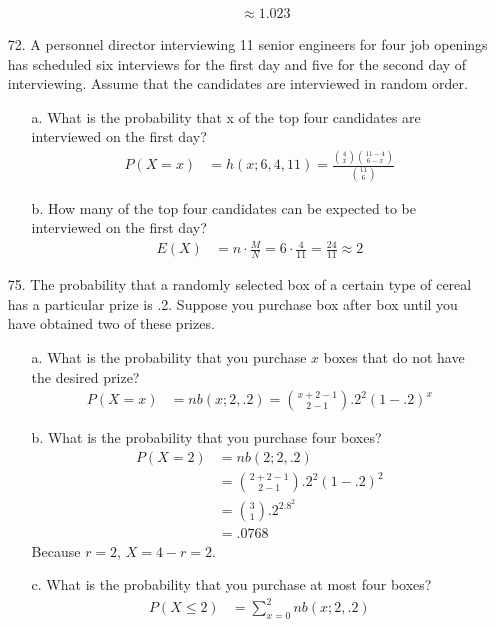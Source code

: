 \documentclass[letterpaper,12pt]{article}
\newcommand{\hg}[4]{%
  \frac%
    {\binom{#3}{#1} \binom{#4 - #3}{#2 - #1}}%
    {\binom{#4}{#2}}%
}
\newcommand{\hgeq}[4]{%
  h(#1; #2, #3, #4) = \hg{#1}{#2}{#3}{#4}%
}
\newcommand{\nb}[3]{%
  \binom{#1 + #2 - 1}{#2 - 1}{#3}^{#2}(1 - #3)^{#1}%
}
\begin{document}
\begin{enumerate}
\begin{enumerate}
\begin{align*}
          &\approx 1.023
        \end{align*}
    \end{enumerate}
  \item[72.]
    A personnel director interviewing 11 senior engineers for four job openings has scheduled six interviews for the first day and five for the second day of interviewing. Assume that the candidates are interviewed in random order.
    \begin{enumerate}
      \item[a.]
        What is the probability that x of the top four candidates are interviewed on the first day?
        \begin{align*}
          P(X = x) &= \hgeq{x}{6}{4}{11}
        \end{align*}
      \item[b.]
        How many of the top four candidates can be expected to be interviewed on the first day?
        \begin{align*}
          E(X) &= n \cdot \frac{M}{N} = 6 \cdot \frac{4}{11} = \frac{24}{11} \approx 2
        \end{align*}
    \end{enumerate}
  \item[75.]
    The probability that a randomly selected box of a certain type of cereal has a particular prize is .2. Suppose you purchase box after box until you have obtained two of these prizes.
    \begin{enumerate}
      \item[a.]
        What is the probability that you purchase $x$ boxes that do not have the desired prize?
        \begin{align*}
          P(X = x) &= nb(x; 2, .2) = \nb{x}{2}{.2}
        \end{align*}
      \item[b.]
        What is the probability that you purchase four boxes?
        \begin{align*}
          P(X = 2) &= nb(2; 2, .2) \\
          &= \nb{2}{2}{.2} \\
          &= \binom{3}{1}.2^2.8^2 \\
          &= .0768
        \end{align*}
        Because $r = 2$, $X = 4 - r = 2$.
      \item[c.]
        What is the probability that you purchase at most four boxes?
        \begin{align*}
          P(X \le 2) &= \sum_{x = 0}^{2} nb(x; 2, .2) \\

\end{align*}
\end{enumerate}
\end{enumerate}
\end{document}
